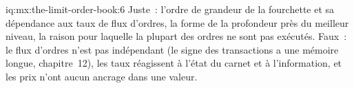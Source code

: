 \begin{solution}{iq:mx:the-limit-order-book:6}
Juste~: l'ordre de grandeur de la fourchette et sa dépendance aux taux de flux d'ordres, la forme de la profondeur près du meilleur niveau, la raison pour laquelle la plupart des ordres ne sont pas exécutés.
Faux~: le flux d'ordres n'est pas indépendant (le signe des transactions a une mémoire longue, chapitre~12), les taux réagissent à l'état du carnet et à l'information, et les prix n'ont
aucun ancrage dans une valeur. 
\end{solution}
